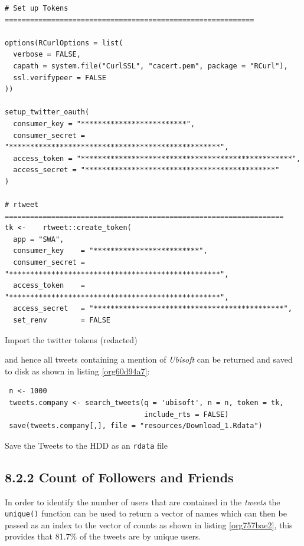 \documentclass[11pt]{article}
\begin{document}
\begin{listing}[htbp]
\begin{verbatim}
# Set up Tokens ===========================================================

options(RCurlOptions = list(
  verbose = FALSE,
  capath = system.file("CurlSSL", "cacert.pem", package = "RCurl"),
  ssl.verifypeer = FALSE
))

setup_twitter_oauth(
  consumer_key = "*************************",
  consumer_secret = "**************************************************",
  access_token = "**************************************************",
  access_secret = "*********************************************"
)

# rtweet ==================================================================
tk <-    rtweet::create_token(
  app = "SWA",
  consumer_key    = "*************************",
  consumer_secret = "**************************************************",
  access_token    = "**************************************************",
  access_secret   = "*********************************************",
  set_renv        = FALSE
\end{verbatim}
\caption{\label{org819c0ea}Import the twitter tokens (redacted)}
\end{listing}

and hence all tweets containing a mention of \emph{Ubisoft} can be returned and saved to disk as shown in listing \ref{org60d94a7}:

\begin{listing}[htbp]
\begin{verbatim}
 n <- 1000
 tweets.company <- search_tweets(q = 'ubisoft', n = n, token = tk,
                                 include_rts = FALSE)
 save(tweets.company[,], file = "resources/Download_1.Rdata")
\end{verbatim}
\caption{\label{org60d94a7}Save the Tweets to the HDD as an \texttt{rdata} file}
\end{listing}

\subsection{8.2.2 Count of Followers and Friends}
\label{sec:orgc4ba99c}
In order to identify the number of users that are contained in the \emph{tweets} the
\texttt{unique()} function can be used to return a vector of names which can then be passed as an index to the vector of counts as shown in listing \ref{org757bae2}, this provides that 81.7\% of the tweets are by unique users.
\end{document}
